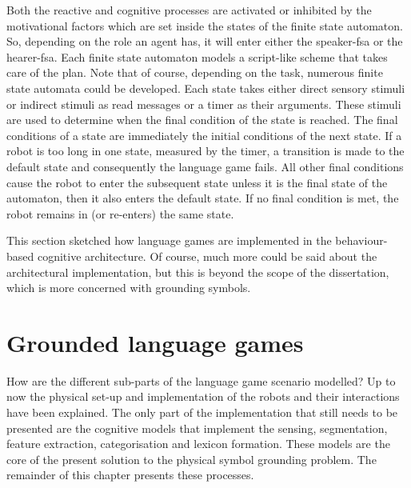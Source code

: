 Both the reactive and cognitive processes are activated or inhibited by the motivational factors which are set inside the states of the finite state automaton. So, depending on the role an agent has, it will enter either the speaker-{\sc fsa} or the hearer-{\sc fsa}. Each finite state automaton models a script-like scheme that takes care of the plan. Note that of course, depending on the task, numerous finite state automata could be developed. Each state takes either direct sensory stimuli or indirect stimuli as read messages or a timer as their arguments. These stimuli are used to determine when the final condition of the state is reached. The final conditions of a state are immediately the initial conditions of the next state. If a robot is too long in one state, measured by the timer, a transition is made to the default state and consequently the language game fails. All other final conditions cause the robot to enter the subsequent state unless it is the final state of the automaton, then it also enters the default state. If no final condition is met, the robot remains in (or re-enters) the same state.

This section sketched how language games are implemented in the behaviour-based cognitive architecture. Of course, much more could be said about the architectural implementation, but this is beyond the scope of the dissertation, which is more concerned with grounding symbols.

\section{Grounded language games}\label{s:lg:grounded}

How are the different sub-parts of the language game scenario modelled? Up to now the physical set-up and implementation of the robots and their interactions have been explained. The only part of the implementation that still needs to be presented are the cognitive models that implement the sensing, segmentation, feature extraction, categorisation and lexicon formation. These models are the core of the present solution to the physical symbol grounding problem. The remainder of this chapter presents these processes.

